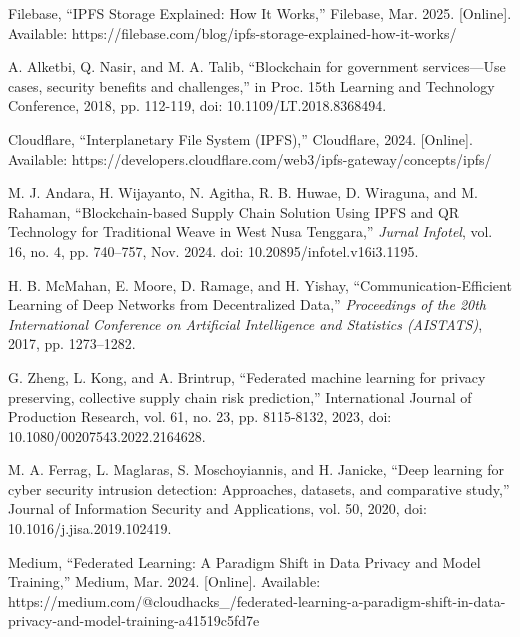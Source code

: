 \documentclass[conference]{IEEEtran}
\begin{document}
\begin{thebibliography}{00}
 Filebase, ``IPFS Storage Explained: How It Works,'' Filebase, Mar. 2025. [Online]. Available: https://filebase.com/blog/ipfs-storage-explained-how-it-works/

 A. Alketbi, Q. Nasir, and M. A. Talib, ``Blockchain for government services—Use cases, security benefits and challenges,'' in Proc. 15th Learning and Technology Conference, 2018, pp. 112-119, doi: 10.1109/LT.2018.8368494.

 Cloudflare, ``Interplanetary File System (IPFS),'' Cloudflare, 2024. [Online]. Available: https://developers.cloudflare.com/web3/ipfs-gateway/concepts/ipfs/

 M. J. Andara, H. Wijayanto, N. Agitha, R. B. Huwae, D. Wiraguna, and M. Rahaman, ``Blockchain-based Supply Chain Solution Using IPFS and QR Technology for Traditional Weave in West Nusa Tenggara,'' \textit{Jurnal Infotel}, vol. 16, no. 4, pp. 740–757, Nov. 2024. doi: 10.20895/infotel.v16i3.1195.

 H. B. McMahan, E. Moore, D. Ramage, and H. Yishay, ``Communication-Efficient Learning of Deep Networks from Decentralized Data,'' \textit{Proceedings of the 20th International Conference on Artificial Intelligence and Statistics (AISTATS)}, 2017, pp. 1273–1282.

 G. Zheng, L. Kong, and A. Brintrup, ``Federated machine learning for privacy preserving, collective supply chain risk prediction,'' International Journal of Production Research, vol. 61, no. 23, pp. 8115-8132, 2023, doi: 10.1080/00207543.2022.2164628.

 M. A. Ferrag, L. Maglaras, S. Moschoyiannis, and H. Janicke, ``Deep learning for cyber security intrusion detection: Approaches, datasets, and comparative study,'' Journal of Information Security and Applications, vol. 50, 2020, doi: 10.1016/j.jisa.2019.102419.

 Medium, ``Federated Learning: A Paradigm Shift in Data Privacy and Model Training,'' Medium, Mar. 2024. [Online]. Available: https://medium.com/@cloudhacks\_/federated-learning-a-paradigm-shift-in-data-privacy-and-model-training-a41519c5fd7e
\end{thebibliography}
\end{document}
